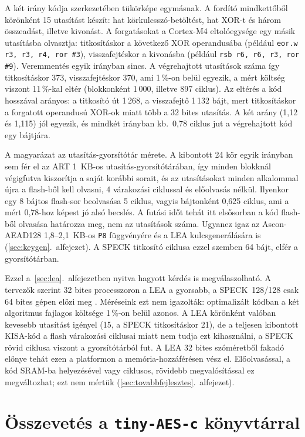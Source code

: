 \documentclass[a4paper,12pt]{report}
\theoremstyle{definition}
\theoremstyle{remark}
\begin{document}
A két irány kódja szerkezetében tükörképe egymásnak. A fordító mindkettőből körönként 15 utasítást készít: hat körkulcsszó-betöltést, hat XOR-t és három összeadást, illetve kivonást. A forgatásokat a Cortex-M4 eltolóegysége egy másik utasításba olvasztja: titkosításkor a következő XOR operandusába (például \texttt{eor.w r3, r3, r4, ror \#3}), visszafejtéskor a kivonásba (például \texttt{rsb r6, r6, r3, ror \#9}). Veremmentés egyik irányban sincs. A végrehajtott utasítások száma így titkosításkor 373, visszafejtéskor 370, ami 1\,\%-on belül egyezik, a mért költség viszont 11\,\%-kal eltér (blokkonként 1\,000, illetve 897 ciklus). Az eltérés a kód hosszával arányos: a titkosító út 1\,268, a visszafejtő 1\,132 bájt, mert titkosításkor a forgatott operandusú XOR-ok miatt több a 32 bites utasítás. A két arány (1,12 és 1,115) jól egyezik, és mindkét irányban kb.\ 0,78 ciklus jut a végrehajtott kód egy bájtjára.

A magyarázat az utasítás-gyorsítótár mérete. A kibontott 24 kör egyik irányban sem fér el az ART 1~KB-os utasítás-gyorsítótárában, így minden blokknál végigfutva kiszorítja a saját korábbi sorait, és az utasításokat minden alkalommal újra a flash-ből kell olvasni, 4 várakozási ciklussal és előolvasás nélkül. Ilyenkor egy 8 bájtos flash-sor beolvasása 5 ciklus, vagyis bájtonként 0,625 ciklus, ami a mért 0,78-hoz képest jó alsó becslés. A futási időt tehát itt elsősorban a kód flash-ből olvasása határozza meg, nem az utasítások száma. Ugyanez igaz az Ascon-AEAD128 1,8--2,1~KB-os \texttt{P8} függvényére és a LEA kulcsgenerálására is (\ref{sec:keygen}.~alfejezet). A SPECK titkosító ciklusa ezzel szemben 64 bájt, elfér a gyorsítótárban.

Ezzel a~\ref{sec:lea}.~alfejezetben nyitva hagyott kérdés is megválaszolható. A tervezők szerint 32 bites processzoron a LEA a gyorsabb, a SPECK~128/128 csak 64 bites gépen előzi meg \cite{Hong2013}. Méréseink ezt nem igazolták: optimalizált kódban a két algoritmus fajlagos költsége 1\,\%-on belül azonos. A LEA körönként valóban kevesebb utasítást igényel (15, a SPECK titkosításkor 21), de a teljesen kibontott KISA-kód a flash várakozási ciklusai miatt nem tudja ezt kihasználni, a SPECK rövid ciklusa viszont a gyorsítótárból fut. A LEA 32 bites szóméretből fakadó előnye tehát ezen a platformon a memória-hozzáférésen vész el. Előolvasással, a kód SRAM-ba helyezésével vagy ciklusos, rövidebb megvalósítással ez megváltozhat; ezt nem mértük (\ref{sec:tovabbfejlesztes}.~alfejezet).

\section{Összevetés a \texttt{tiny-AES-c} könyvtárral}\label{sec:tiny}
\end{document}
